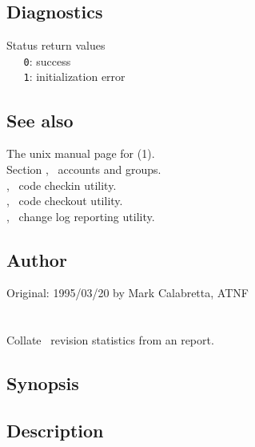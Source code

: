 \subsection*{Diagnostics}
 
Status return values
\\ \verb+   0+: success
\\ \verb+   1+: initialization error
 
\subsection*{See also}
 
The unix manual page for (1).\\
Section , \aipspp\ accounts and groups.\\
, \aipspp\ code checkin utility.\\
, \aipspp\ code checkout utility.\\
, \aipspp\ change log reporting utility.
 
\subsection*{Author}
 
Original: 1995/03/20 by Mark Calabretta, ATNF


\newpage
\section{}
\label{astat}



Collate \aipspp\ revision statistics from an  report.

\subsection*{Synopsis}
 
\begin{synopsis}
\end{synopsis}
 
\subsection*{Description}
 
